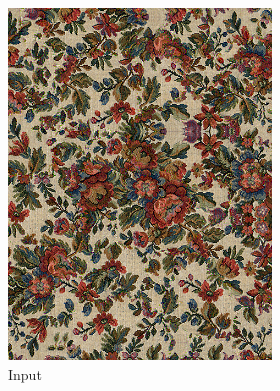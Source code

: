 \begin{figure}[]
    \centering    
    \begin{subfigure}{\textwidth}
        \centering
        \begin{subfigure}{0.24\textwidth}
            \centering
            \includegraphics[width=\textwidth]{images/04-experiment02/human/flowers/target.jpg}
            \caption*{Input}
        \end{subfigure}
        \hfill
        \begin{subfigure}{0.24\textwidth}
            \centering

\end{subfigure}
\end{subfigure}
\end{figure}
